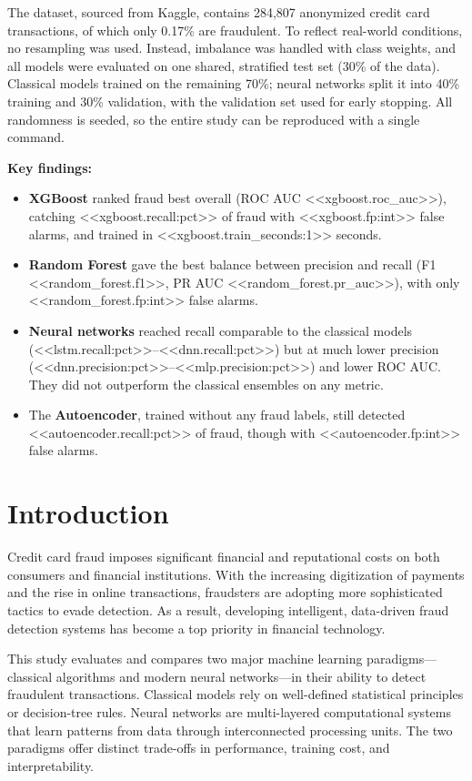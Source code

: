 \documentclass[journal]{IEEEtran}
\begin{document}
The dataset, sourced from Kaggle, contains 284,807 anonymized credit card transactions, of which only 0.17\% are fraudulent. To reflect real-world conditions, no resampling was used. Instead, imbalance was handled with class weights, and all models were evaluated on one shared, stratified test set (30\% of the data). Classical models trained on the remaining 70\%; neural networks split it into 40\% training and 30\% validation, with the validation set used for early stopping. All randomness is seeded, so the entire study can be reproduced with a single command.

\textbf{Key findings:}
\begin{itemize}
  \item \textbf{XGBoost} ranked fraud best overall (ROC AUC <<xgboost.roc_auc>>), catching <<xgboost.recall:pct>> of fraud with <<xgboost.fp:int>> false alarms, and trained in <<xgboost.train_seconds:1>> seconds.
  \item \textbf{Random Forest} gave the best balance between precision and recall (F1 <<random_forest.f1>>, PR AUC <<random_forest.pr_auc>>), with only <<random_forest.fp:int>> false alarms.
  \item \textbf{Neural networks} reached recall comparable to the classical models (<<lstm.recall:pct>>--<<dnn.recall:pct>>) but at much lower precision (<<dnn.precision:pct>>--<<mlp.precision:pct>>) and lower ROC AUC. They did not outperform the classical ensembles on any metric.
  \item The \textbf{Autoencoder}, trained without any fraud labels, still detected <<autoencoder.recall:pct>> of fraud, though with <<autoencoder.fp:int>> false alarms.
\end{itemize}

\section{Introduction}
Credit card fraud imposes significant financial and reputational costs on both consumers and financial institutions. With the increasing digitization of payments and the rise in online transactions, fraudsters are adopting more sophisticated tactics to evade detection. As a result, developing intelligent, data-driven fraud detection systems has become a top priority in financial technology.

This study evaluates and compares two major machine learning paradigms---classical algorithms and modern neural networks---in their ability to detect fraudulent transactions. Classical models rely on well-defined statistical principles or decision-tree rules. Neural networks are multi-layered computational systems that learn patterns from data through interconnected processing units. The two paradigms offer distinct trade-offs in performance, training cost, and interpretability.
\end{document}
